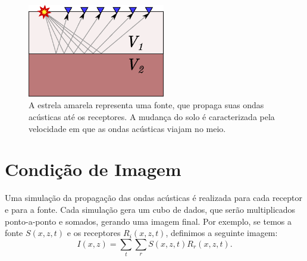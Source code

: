 \documentclass[a4paper,12pt]{article}
\begin{document}
\begin{figure}
  \centering
  \includegraphics[width=6cm]{images/solo}
  \caption{A estrela amarela representa uma fonte, que propaga suas
  ondas acústicas até os receptores. A mudança do solo é caracterizada
pela velocidade em que as ondas acústicas viajam no meio.}
\end{figure}

\section{Condição de Imagem}

Uma simulação da propagação das ondas acústicas é realizada para cada
receptor e para a fonte. Cada simulação gera um cubo de dados, que serão
multiplicados ponto-a-ponto e somados, gerando uma imagem final. Por
exemplo, se temos a fonte $S(x, z, t)$ e os receptores $R_i(x, z, t)$,
definimos a seguinte imagem:
\[
  I(x, z) = \sum_t \sum_r S(x, z, t)R_r(x, z, t).
\]
\end{document}
